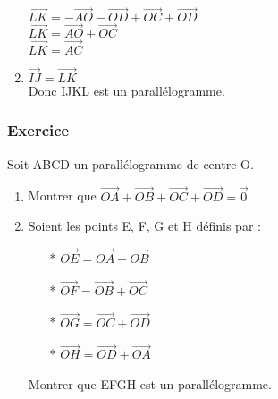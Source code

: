\begin{enumerate}
$ \overrightarrow{LK} = -\overrightarrow{AO} - \overrightarrow{OD} + \overrightarrow{OC} + \overrightarrow{OD} $\\

$ \overrightarrow{LK} = \overrightarrow{AO} + \overrightarrow{OC} $\\

$ \overrightarrow{LK} = \overrightarrow{AC} $\\

\item $ \overrightarrow{IJ} = \overrightarrow{LK} $\\

Donc IJKL est un parallélogramme.

\end{enumerate}
\newpage
\subsubsection{Exercice }

Soit ABCD un parallélogramme de centre O.

\begin{enumerate}

\item  Montrer que $\overrightarrow{OA} + \overrightarrow{OB} + \overrightarrow{OC} + \overrightarrow{OD} = \overrightarrow{0} $

\item  Soient les points E, F, G et H définis par :

\begin{itemize}
\item[*] $\overrightarrow{OE} = \overrightarrow{OA} + \overrightarrow{OB} $\\
\item [*]$ \overrightarrow{OF} = \overrightarrow{OB} + \overrightarrow{OC} $\\
\item [*]$ \overrightarrow{OG} = \overrightarrow{OC} + \overrightarrow{OD} $\\
\item [*]$ \overrightarrow{OH} = \overrightarrow{OD} + \overrightarrow{OA} $\\
\end{itemize}

Montrer que EFGH est un parallélogramme.

\end{enumerate}


